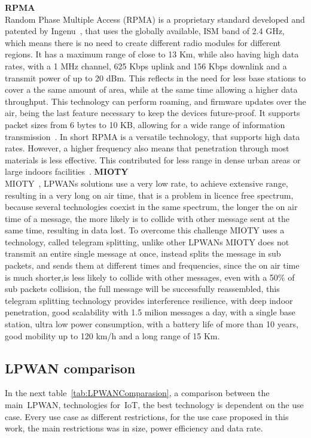 \textbf{RPMA}\\

Random Phase Multiple Access (RPMA) is a proprietary standard developed and patented by Ingenu~\cite{Ingenu}, that uses the globally available, \gls{ISM} band of 2.4 GHz, which means there is no need to create different radio modules for different regions. It has a maximum range of close to 13 Km, while also having high data rates, with a 1 MHz channel, 625 Kbps uplink and 156 Kbps downlink and a transmit power of up to 20 dBm.
This reflects in the need for less base stations to cover a the same amount of  area, while at the same time allowing a higher data throughput. 
This technology can perform roaming, and firmware updates over the air, being the last feature necessary to keep the devices future-proof. It supports packet sizes from 6 bytes to 10 KB, allowing for a wide range of information transmission~\cite{Bernardo2019}. 
In short RPMA is a versatile technology, that supports high data rates. However, a higher frequency also means that penetration through most materials is less effective. This contributed for less range in dense urban areas or large indoors facilities~\cite{LPPenaQueralta2019}.\newline\newline
\textbf{MIOTY}\\

MIOTY~\cite{MIOTY}, LPWANs solutions use a very low rate, to achieve extensive range, resulting in a very long on air time, that is a problem in licence free spectrum, because several technologies coexist in the same spectrum, the longer the on air time of a message, the more likely is to collide with other message sent at the same time, resulting in data lost. To overcome this challenge MIOTY uses a technology, called telegram splitting, unlike other LPWANs MIOTY does not transmit an entire single message at once, instead splits the message in sub packets, and sends them at different times and frequencies, since the on air time is much shorter,is less likely to collide with other messages, even with a 50\% of sub packets collision, the full message will be successfully reassembled, this telegram splitting technology provides interference resilience, with deep indoor penetration, good scalability with 1.5 milion messages a day, with a single base station, ultra low power consumption, with a battery life of more than 10 years, good mobility up to 120 km/h and a long range of 15 Km.

\newpage
\subsection{LPWAN comparison } %
\label{subsec:LPWAN comparison }
In the next table~\ref{tab:LPWANComparasion}, a comparison between the main~\gls{LPWAN}, technologies for~\gls{IoT}, the best technology is dependent on the use case. Every use case as different restrictions, for the use case proposed in this work, the main restrictions was in size, power efficiency and data rate. 


